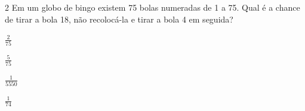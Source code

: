 

\num{2} Em um globo de bingo existem 75 bolas numeradas de 1 a 75. Qual é a
chance de tirar a bola 18, não recolocá-la e tirar a bola 4 em seguida?

\begin{escolha}
\item $\frac{2}{75}$
\item $\frac{5}{75}$
\item $\frac{1}{5550}$
\item $\frac{1}{74}$
\end{escolha}



